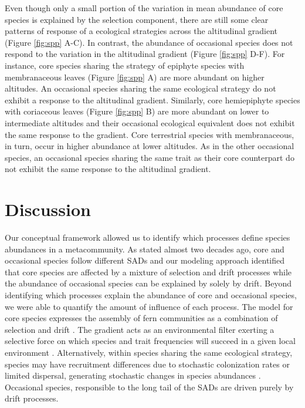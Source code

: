 \documentclass[12pt]{article}
\begin{document}
Even though only a small portion of the variation in mean abundance of
core species is explained by the selection component, there are still
some clear patterns of response of a ecological strategies across the
altitudinal gradient (Figure \ref{fig:spp} A-C). In contrast, the
abundance of occasional species does not respond to the variation in
the altitudinal gradient (Figure \ref{fig:spp} D-F). For instance,
core species sharing the strategy of epiphyte species with
membranaceous leaves (Figure \ref{fig:spp} A) are more abundant on
higher altitudes. An occasional species sharing the same ecological
strategy do not exhibit a response to the altitudinal
gradient. Similarly, core hemiepiphyte species with coriaceous leaves
(Figure \ref{fig:spp} B) are more abundant on lower to intermediate
altitudes and their occasional ecological equivalent does not exhibit
the same response to the gradient. Core terrestrial species with
membranaceous, in turn, occur in higher abundance at lower
altitudes. As in the other occasional species, an occasional species
sharing the same trait as their core counterpart do not exhibit the
same response to the altitudinal gradient.

\section*{Discussion}



Our conceptual framework allowed us to identify which processes define species abundances in a metacommunity. As \cite{Magurran2003} stated almost two decades ago, core and occasional species follow different SADs and our modeling approach identified that core species are affected by a mixture of selection and drift processes while the abundance of occasional species can be explained by solely by drift. Beyond identifying which processes explain the abundance of core and occasional species, we were able to quantify the amount of influence of each process. The model for core species expresses the assembly of fern communities as a combination of selection and drift \citep{Vellend2010}. The gradient acts as an environmental filter exerting a selective force on which species and trait frequencies will succeed in a given local environment \citep{Webb2010}.  Alternatively, within species sharing the same ecological strategy, species may have recruitment differences due to stochastic colonization rates or limited dispersal, generating stochastic changes in species abundances \citep{Gravel2006, Weiher2011}. Occasional species, responsible to the long tail of the SADs are driven purely by drift processes. %
\end{document}
